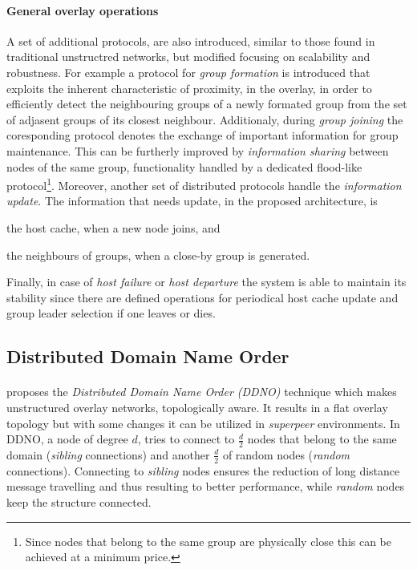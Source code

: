 \documentclass[a4paper,10pt]{article}
\begin{document}
\paragraph{General overlay operations} A set of additional protocols, are also introduced, similar to those found in traditional unstructred networks, but modified focusing on scalability and robustness. For example a protocol for \emph{group formation} is introduced that exploits the inherent characteristic of proximity, in the overlay, in order to efficiently detect the neighbouring groups of a newly formated group from the set of adjasent groups of its closest neighbour. Additionaly, during \emph{group joining} the coresponding protocol denotes the exchange of important information for group maintenance. This can be furtherly improved by \emph{information sharing} between nodes of the same group, functionality handled by a dedicated flood-like protocol\footnote{Since nodes that belong to the same group are physically close this can be achieved at a minimum price.}. Moreover, another set of distributed protocols handle the \emph{information update}. The information that needs update, in the proposed architecture, is
\begin{inparaenum}
  \item the host cache, when a new node joins, and
  \item the neighbours of groups, when a close-by group is generated.
\end{inparaenum}
Finally, in case of \emph{host failure} or \emph{host departure} the system is able to maintain its stability since there are defined operations for periodical host cache update and group leader selection if one leaves or dies.

\subsection{Distributed Domain Name Order}

\paragraph{}
\cite{zeinalipour-yazti_ddno_2005} proposes the \emph{Distributed Domain Name Order (DDNO)} technique which makes unstructured overlay networks, topologically aware. It results in a flat overlay topology but with some changes it can be utilized in \emph{superpeer} environments. In DDNO, a node of degree $d$, tries to connect to $\frac{d}{2}$ nodes that belong to the same domain (\emph{sibling} connections) and another $\frac{d}{2}$ of random nodes (\emph{random} connections). Connecting to \emph{sibling} nodes ensures the reduction of long distance message travelling and thus resulting to better performance, while \emph{random} nodes keep the structure connected.
\end{document}
